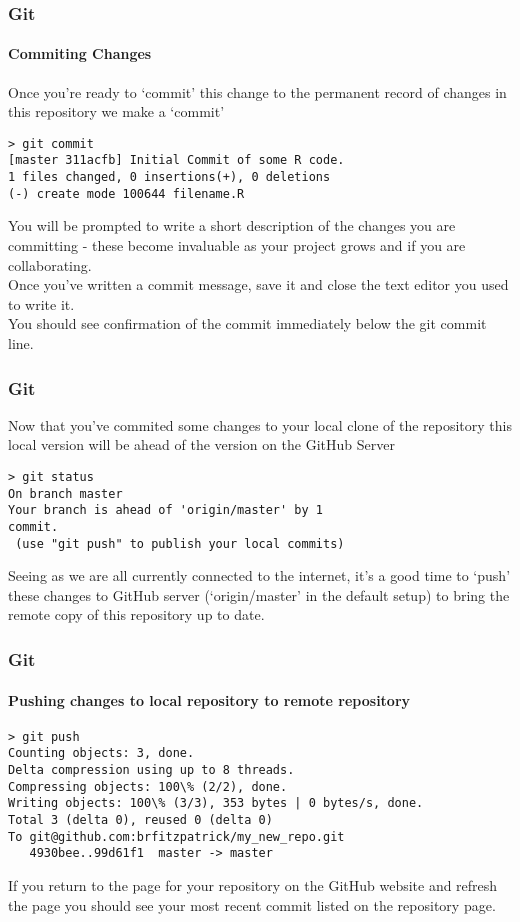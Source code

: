\documentclass[xcolor=dvipsnames]{beamer}
\begin{document}
\begin{frame}[fragile]
\frametitle{Git}
\framesubtitle{Commiting Changes}
Once you're ready to `commit' this change to the permanent record of changes in this repository we make a `commit'
\begin{block}{}
\begin{lstlisting}
> git commit
[master 311acfb] Initial Commit of some R code.
1 files changed, 0 insertions(+), 0 deletions
(-) create mode 100644 filename.R
\end{lstlisting}
\end{block}
You will be prompted to write a short description of the changes you are committing - these become invaluable as your project grows and if you are collaborating.\\
Once you've written a commit message, save it and close the text editor you used to write it.\\
You should see confirmation of the commit immediately below the git commit line.
\end{frame}

\begin{frame}[fragile]
\frametitle{Git}
Now that you've commited some changes to your local clone of the repository this local version will be ahead of the version on the GitHub Server
\begin{block}{}
\begin{lstlisting}
> git status
On branch master
Your branch is ahead of 'origin/master' by 1
commit.
 (use "git push" to publish your local commits)
\end{lstlisting}
\end{block}
Seeing as we are all currently connected to the internet, it's a good time to `push' these changes to GitHub server (`origin/master' in the default setup) to bring the remote copy of this repository up to date.
\end{frame}

\begin{frame}[fragile]
\frametitle{Git}
\framesubtitle{Pushing changes to local repository to remote repository}
\begin{block}{}
\begin{lstlisting}
> git push
Counting objects: 3, done.
Delta compression using up to 8 threads.
Compressing objects: 100\% (2/2), done.
Writing objects: 100\% (3/3), 353 bytes | 0 bytes/s, done.
Total 3 (delta 0), reused 0 (delta 0)
To git@github.com:brfitzpatrick/my_new_repo.git
   4930bee..99d61f1  master -> master
\end{lstlisting}
\end{block}
If you return to the page for your repository on the GitHub website and refresh the page you should see your most recent commit listed on the repository page.
\end{frame}
\end{document}
